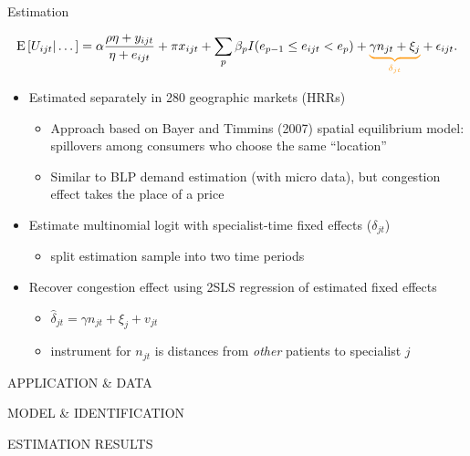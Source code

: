 \documentclass[slides, aspectratio=169]{beamer}
\newcommand{\bit}{\begin{itemize}}
\newcommand{\eit}{\end{itemize}}
\begin{document}

\begin{frame}[t]{Estimation}

\vskip-6pt

\begin{equation*}
    \text{E} \left[ U_{ijt} | \dots \right] =
    \alpha \frac{\rho \eta + y_{ijt}}{\eta + e_{ijt}}
    + \pi x_{ijt}
    + \sum_{p}\beta_{p} I(e_{p-1}\leq e_{ijt} < e_{p})
    + {\color{JHUorange} \underbrace{\color{black} \gamma n_{jt}  + \xi_j}_{\delta_{jt}} } + \epsilon_{ijt} .
\end{equation*}

\begin{itemize}

\item Estimated separately in 280 geographic markets (HRRs)
\bit
\item Approach based on Bayer and Timmins (2007) spatial equilibrium model:
spillovers among consumers who choose the same ``location''
\item Similar to BLP demand estimation (with micro data),
but congestion effect takes the place of a price
\eit
\medskip \pause

\item[1.] Estimate multinomial logit with specialist-time fixed effects ($\delta_{jt}$) 
\bit
    \item split estimation sample into two time periods
\eit

\item[2.] Recover congestion effect using 2SLS regression of estimated fixed effects
\bit
    \item $\hat \delta_{jt} = \gamma n_{jt} + \xi_j + v_{jt}$
    \item instrument for $n_{jt}$ is distances from \emph{other} patients to specialist $j$
\eit


\end{itemize}

\end{frame}




\begin{frame}[noframenumbering]
\begin{center}
\LARGE

\color{lightgray}
APPLICATION \& DATA

\color{lightgray}
MODEL \& IDENTIFICATION

\color{heritageblue}
ESTIMATION RESULTS

\end{center}
\end{frame}
\end{document}
